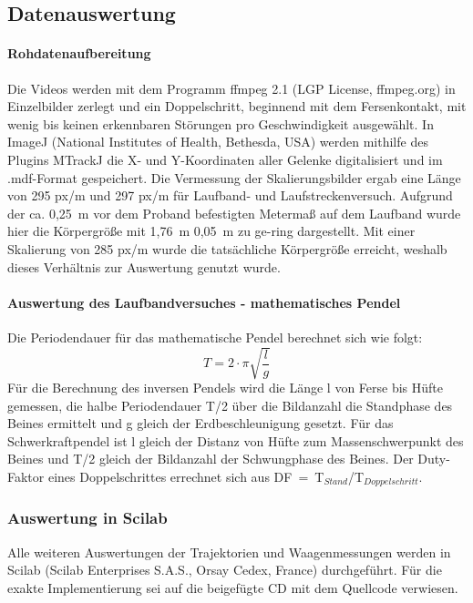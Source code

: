 \subsection{Datenauswertung}
\paragraph{Rohdatenaufbereitung}
Die Videos werden mit dem Programm ffmpeg 2.1 (LGP License, ffmpeg.org) in Einzelbilder zerlegt und ein Doppelschritt, beginnend mit dem Fersenkontakt, mit wenig bis keinen erkennbaren Störungen pro Geschwindigkeit ausgewählt. In ImageJ (National Institutes of Health, Bethesda, USA) werden mithilfe des Plugins MTrackJ \autocite{meijering2012methods} die X- und Y-Koordinaten aller Gelenke digitalisiert und im .mdf-Format gespeichert. Die Vermessung der Skalierungsbilder ergab eine Länge von 295 px/m und 297 px/m für Laufband- und Laufstreckenversuch. Aufgrund der ca. 0,25~m vor dem Proband befestigten Metermaß auf dem Laufband wurde hier die Körpergröße mit 1,76~m 0,05~m zu ge-ring dargestellt. Mit einer Skalierung von 285 px/m wurde die tatsächliche Körpergröße erreicht, weshalb dieses Verhältnis zur Auswertung genutzt wurde.
\paragraph{Auswertung des Laufbandversuches - mathematisches Pendel}
Die Periodendauer für das mathematische Pendel berechnet sich wie folgt:
\begin{equation}
T = 2 \cdot \pi \sqrt{\frac{l}{g}}
\end{equation}
Für die Berechnung des inversen Pendels wird die Länge l von Ferse bis Hüfte gemessen, die halbe Periodendauer T/2 über die Bildanzahl die Standphase des Beines ermittelt und g gleich der Erdbeschleunigung gesetzt. Für das Schwerkraftpendel ist l gleich der Distanz von Hüfte zum Massenschwerpunkt des Beines und T/2 gleich der Bildanzahl der Schwungphase des Beines. Der Duty-Faktor eines Doppelschrittes errechnet sich aus DF~=~T$_{Stand}$/T$_{Doppelschritt}$.
\subsubsection*{Auswertung in Scilab}
Alle weiteren Auswertungen der Trajektorien und Waagenmessungen werden in Scilab (Scilab Enterprises S.A.S., Orsay Cedex, France) durchgeführt. Für die exakte Implementierung sei auf die beigefügte CD mit dem Quellcode verwiesen.


